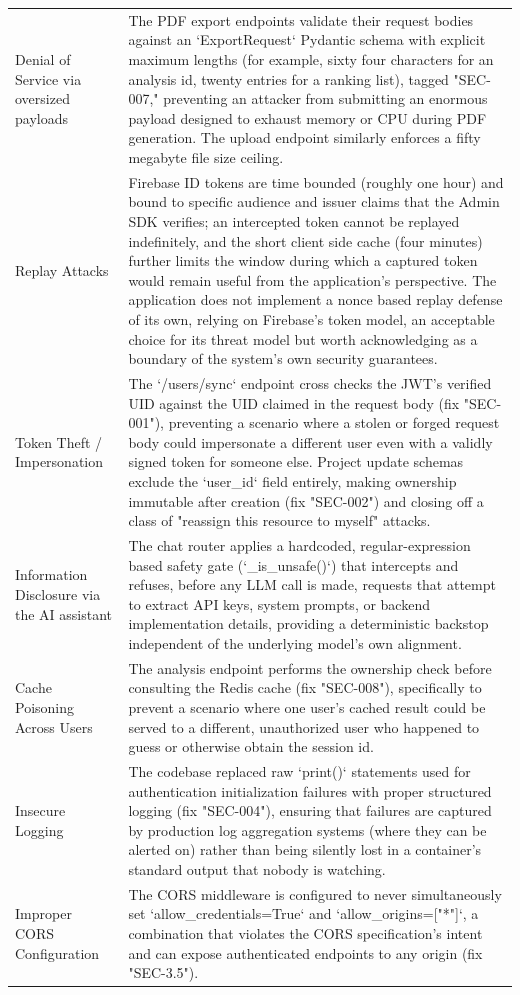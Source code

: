 \documentclass[11pt,a4paper]{report}
\begin{document}
\begin{longtable}{p{3.0cm}p{9.4cm}}
Denial of Service via oversized payloads & The PDF export endpoints validate their request bodies against an `ExportRequest` Pydantic schema with explicit maximum lengths (for example, sixty four characters for an analysis id, twenty entries for a ranking list), tagged "SEC-007," preventing an attacker from submitting an enormous payload designed to exhaust memory or CPU during PDF generation. The upload endpoint similarly enforces a fifty megabyte file size ceiling. \\
Replay Attacks & Firebase ID tokens are time bounded (roughly one hour) and bound to specific audience and issuer claims that the Admin SDK verifies; an intercepted token cannot be replayed indefinitely, and the short client side cache (four minutes) further limits the window during which a captured token would remain useful from the application's perspective. The application does not implement a nonce based replay defense of its own, relying on Firebase's token model, an acceptable choice for its threat model but worth acknowledging as a boundary of the system's own security guarantees. \\
Token Theft / Impersonation & The `/users/sync` endpoint cross checks the JWT's verified UID against the UID claimed in the request body (fix "SEC-001"), preventing a scenario where a stolen or forged request body could impersonate a different user even with a validly signed token for someone else. Project update schemas exclude the `user_id` field entirely, making ownership immutable after creation (fix "SEC-002") and closing off a class of "reassign this resource to myself" attacks. \\
Information Disclosure via the AI assistant & The chat router applies a hardcoded, regular-expression based safety gate (`_is_unsafe()`) that intercepts and refuses, before any LLM call is made, requests that attempt to extract API keys, system prompts, or backend implementation details, providing a deterministic backstop independent of the underlying model's own alignment. \\
Cache Poisoning Across Users & The analysis endpoint performs the ownership check before consulting the Redis cache (fix "SEC-008"), specifically to prevent a scenario where one user's cached result could be served to a different, unauthorized user who happened to guess or otherwise obtain the session id. \\
Insecure Logging & The codebase replaced raw `print()` statements used for authentication initialization failures with proper structured logging (fix "SEC-004"), ensuring that failures are captured by production log aggregation systems (where they can be alerted on) rather than being silently lost in a container's standard output that nobody is watching. \\
Improper CORS Configuration & The CORS middleware is configured to never simultaneously set `allow_credentials=True` and `allow_origins=["*"]`, a combination that violates the CORS specification's intent and can expose authenticated endpoints to any origin (fix "SEC-3.5"). \\
\bottomrule
\end{longtable}
\end{document}
